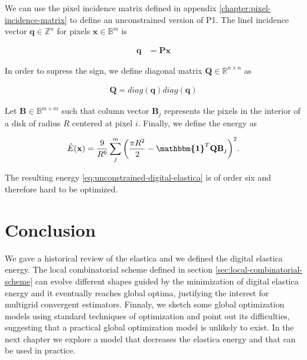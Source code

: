 We can use the pixel incidence matrix defined in appendix \ref{chapter:pixel-incidence-matrix} to define an unconstrained version of P1. The linel incidence vector $\mathbf{q} \in \mathbb{Z}^n$ for pixels $\mathbf{x} \in \mathbb{B}^{m}$ is 
	
	\begin{align*}
		\mathbf{q} &= \mathbf{P} \mathbf{x}
	\end{align*}

In order to supress the sign, we define diagonal matrix $\mathbf{Q} \in \mathbb{R}^{n \times n }$ as

\begin{align*}
	\mathbf{Q} = diag(\mathbf{q})diag(\mathbf{q})
\end{align*}

Let $\mathbf{B} \in \mathbb{B}^{m\times m}$ such that column vector $\mathbf{B}_j$ represents the pixels in the interior of a disk of radius $R$ centered at pixel $i$. Finally, we define the energy as

\begin{align}
	\hat{E}(\mathbf{x}) = \frac{9}{R^6}\sum_{j}^{m}{\left( \frac{\pi R^2}{2} - \boldsymbol{\mathbbm{1}}^T{\mathbf{Q}}\mathbf{B}_j \right)^2}.
	\label{eq:unconstrained-digital-elastica}
\end{align}


The resulting energy \eqref{eq:unconstrained-digital-elastica} is of order six and therefore hard to be optimized.

\section{Conclusion}
\label{ch6:sec:conclusion}
We gave a historical review of the elastica and we defined the digital elastica energy. The local combinatorial scheme defined in section \ref{sec:local-combinatorial-scheme} can evolve different shapes guided by the minimization of digital elastica energy and it eventually reaches global optima, justifying the interest for multigrid convergent estimators. Finnaly, we sketch some global optimization models using standard techniques of optimization and point out its difficulties, suggesting that a practical global optimization model is unlikely to exist. In the next chapter we explore a model that decreases the elastica energy and that can be used in practice.

